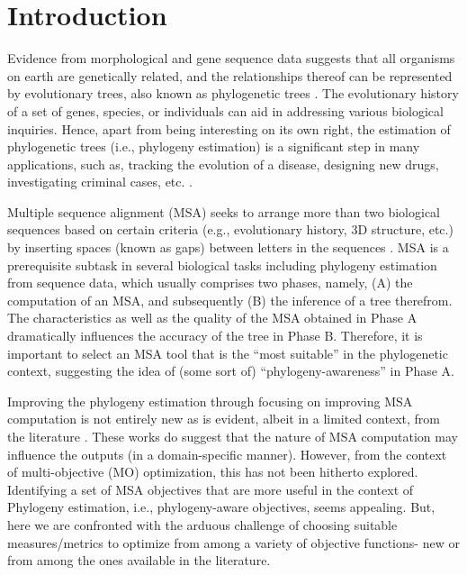 \chapter{Introduction}

Evidence from morphological and gene sequence data suggests that all organisms on earth are genetically related, and the relationships thereof can be represented by evolutionary trees, also known as phylogenetic trees \cite{warnow2017computational}. The evolutionary history of a set of genes, species, or individuals can aid in addressing various biological inquiries. Hence, apart from being interesting on its own right, the estimation of phylogenetic trees (i.e., phylogeny estimation) is a significant step in many applications, such as, tracking the evolution of a disease, designing new drugs, investigating criminal cases, etc. \cite{bush1999predicting, aluru2005handbook}. 

Multiple sequence alignment (MSA) seeks to arrange more than two biological sequences based on certain criteria (e.g., evolutionary history, 3D structure, etc.) by inserting spaces (known as gaps) between letters in the sequences \cite{warnow2017computational}. MSA is a prerequisite subtask in several biological tasks including phylogeny estimation from sequence data, which usually comprises two phases, namely, (A) the computation of an MSA, and subsequently (B) the inference of a tree therefrom. The characteristics as well as the quality of the MSA obtained in Phase A dramatically influences the accuracy of the tree in Phase B. Therefore, it is important to select an MSA tool that is the “most suitable” in the phylogenetic context, suggesting the idea of (some sort of) “phylogeny-awareness” in Phase A. 

Improving the phylogeny estimation through focusing on improving MSA computation is not entirely new as is evident, albeit in a limited context, from the literature \cite{redelings2005joint, ashkenazy2018multiple, warnow2013large}. These works do suggest that the nature of MSA computation may influence the outputs (in a domain-specific manner). However, from the context of multi-objective (MO) optimization, this has not been hitherto explored. Identifying a set of MSA objectives that are more useful in the context of Phylogeny estimation, i.e., phylogeny-aware objectives, seems appealing. But, here we are confronted with the arduous challenge of choosing suitable measures/metrics to optimize from among a variety of objective functions- new or from among the ones available in the literature. 

